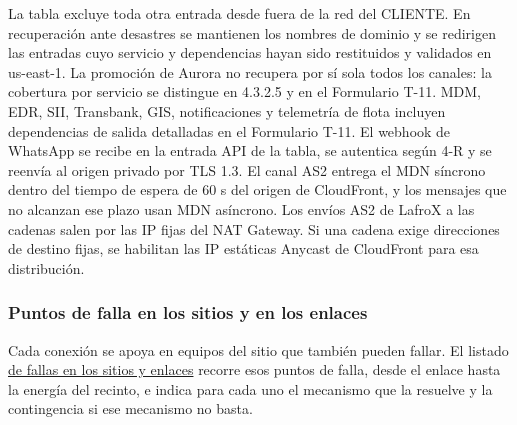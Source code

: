 La tabla excluye toda otra entrada desde fuera de la red del CLIENTE. En recuperación ante desastres se mantienen los nombres de dominio y se redirigen las entradas cuyo servicio y dependencias hayan sido restituidos y validados en us-east-1. La promoción de Aurora no recupera por sí sola todos los canales: la cobertura por servicio se distingue en 4.3.2.5 y en el Formulario T-11. MDM, EDR, SII, Transbank, GIS, notificaciones y telemetría de flota incluyen dependencias de salida detalladas en el Formulario T-11. El webhook de WhatsApp se recibe en la entrada API de la tabla, se autentica según 4-R y se reenvía al origen privado por TLS 1.3. El canal AS2 entrega el MDN síncrono dentro del tiempo de espera de 60 s del origen de CloudFront, y los mensajes que no alcanzan ese plazo usan MDN asíncrono. Los envíos AS2 de LafroX a las cadenas salen por las IP fijas del NAT Gateway. Si una cadena exige direcciones de destino fijas, se habilitan las IP estáticas Anycast de CloudFront para esa distribución.

\subsubsection{Puntos de falla en los sitios y en los enlaces}

Cada conexión se apoya en equipos del sitio que también pueden fallar. El listado \hyperref[tab:fallas-sitios]{de fallas en los sitios y enlaces} recorre esos puntos de falla, desde el enlace hasta la energía del recinto, e indica para cada uno el mecanismo que la resuelve y la contingencia si ese mecanismo no basta.

